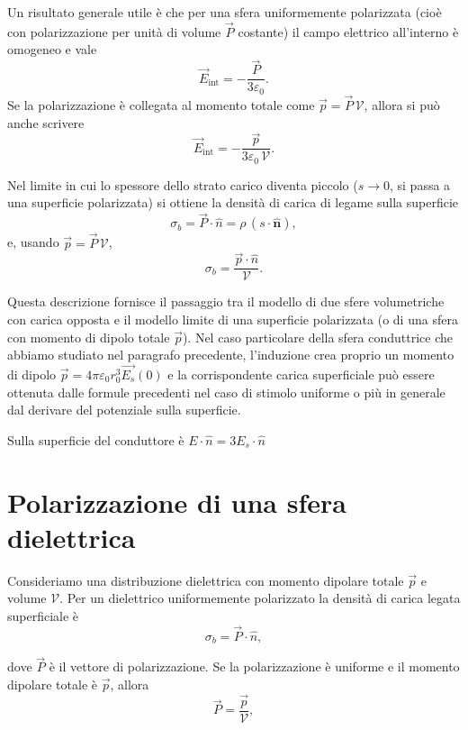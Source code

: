 \documentclass{book}
\begin{document}
Un risultato generale utile è che per una sfera uniformemente polarizzata (cioè con polarizzazione per unità di volume $\vec{ P}$ costante) il campo elettrico all'interno è omogeneo e vale
\[
\vec{ E}_{\text{int}} = -\frac{\vec{ P}}{3\varepsilon_0}.
\]
Se la polarizzazione è collegata al momento totale come $\vec{ p}=\vec{ P}\,\mathcal{V}$, allora si può anche scrivere
\[
\vec{ E}_{\text{int}} = -\frac{\vec{ p}}{3\varepsilon_0\,\mathcal{V}}.
\]

Nel limite in cui lo spessore dello strato carico diventa piccolo ($s\to 0$, si passa a una superficie polarizzata) si ottiene la densità di carica di legame sulla superficie
\[
\sigma_b = \vec{ P}\cdot\hat{n} = \rho\,( s\cdot\hat{\mathbf n}),
\]
e, usando $\vec{p}=\vec{ P}\,\mathcal{V}$,
\[
\sigma_b = \frac{\vec{ p}\cdot\hat{ n}}{\mathcal{V}}.
\]

Questa descrizione fornisce il passaggio tra il modello di due sfere volumetriche con carica opposta e il modello limite di una superficie polarizzata (o di una sfera con momento di dipolo totale $\vec{ p}$). Nel caso particolare della sfera conduttrice che abbiamo studiato nel paragrafo precedente, l'induzione crea proprio un momento di dipolo $\vec{ p}=4\pi\varepsilon_0 r_0^3 \vec{ E_s}(0)$ e la corrispondente carica superficiale può essere ottenuta dalle formule precedenti nel caso di stimolo uniforme o più in generale dal derivare del potenziale sulla superficie.

Sulla superficie del conduttore è $E\cdot \hat{n} =3 E_s\cdot \hat{n}$






\section{Polarizzazione di una sfera dielettrica}

Consideriamo una distribuzione dielettrica con momento dipolare totale $\vec p$ e volume $\mathcal V$. Per un dielettrico uniformemente polarizzato la densit\`a di carica legata superficiale \`e
\begin{equation}
\sigma_b = \vec P\cdot\hat n,
\end{equation}

dove $\vec P$ \`e il vettore di polarizzazione. Se la polarizzazione \`e uniforme e il momento dipolare totale \`e $\vec p$, allora
\begin{equation}
\vec P = \frac{\vec p}{\mathcal V},
\end{equation}
\end{document}
